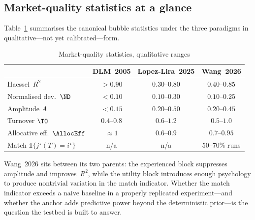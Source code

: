 \subsection{Market-quality statistics at a glance}

Table~\ref{tab:mktq} summarises the canonical bubble statistics
under the three paradigms in qualitative---not yet calibrated---form.

\begin{table}[h]
\centering
\small
\caption{Market-quality statistics, qualitative ranges}
\label{tab:mktq}
\begin{tabular}{l c c c}
\toprule
& DLM~2005 & Lopez-Lira~2025 & Wang~2026 \\
\midrule
Haessel~$R^2$       & $>0.90$      & $0.30$--$0.80$ & $0.40$--$0.85$ \\
Normalised dev.~$\ND$& $<0.10$     & $0.10$--$0.30$ & $0.10$--$0.25$ \\
Amplitude $A$       & $<0.15$      & $0.20$--$0.50$ & $0.20$--$0.45$ \\
Turnover $\TO$      & $0.4$--$0.8$ & $0.6$--$1.2$   & $0.5$--$1.0$   \\
Allocative eff.~$\AllocEff$& $\approx 1$ & $0.6$--$0.9$   & $0.7$--$0.95$  \\
Match $\mathbb{1}\{j^\star(T)=i^\star\}$ & n/a & n/a & 50--70\% runs \\
\bottomrule
\end{tabular}
\end{table}

Wang~2026 sits between its two parents: the experienced block
suppresses amplitude and improves~$R^2$, while the utility block
introduces enough psychology to produce nontrivial variation in the
match indicator. Whether the match indicator exceeds a naive
baseline in a properly replicated experiment---and whether the
anchor adds predictive power beyond the deterministic prior---is
the question the testbed is built to answer.
